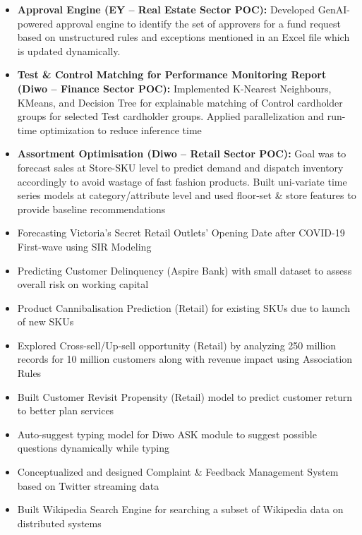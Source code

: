\documentclass[a4paper,10pt]{article}
\begin{document}
\begin{itemize}


\item \textbf{Approval Engine (EY -- Real Estate Sector POC): }{Developed GenAI-powered approval engine to identify the set of approvers for a fund request based on unstructured rules and exceptions mentioned in an Excel file which is updated dynamically.}


\item \textbf{Test \& Control Matching for Performance Monitoring Report (Diwo -- Finance Sector POC): }{Implemented K-Nearest Neighbours, KMeans, and Decision Tree for explainable matching of Control cardholder groups for selected Test cardholder groups. Applied parallelization and run-time optimization to reduce inference time}

\item \textbf{Assortment Optimisation (Diwo -- Retail Sector POC): }{Goal was to forecast sales at Store-SKU level to predict demand and dispatch inventory accordingly to avoid wastage of fast fashion products. Built uni-variate time series models at category/attribute level and used floor-set \& store features to provide baseline recommendations 
}

\item Forecasting Victoria's Secret Retail Outlets' Opening Date after COVID-19 First-wave using SIR Modeling
\item Predicting Customer Delinquency (Aspire Bank) with small dataset to assess overall risk on working capital
\item Product Cannibalisation Prediction (Retail) for existing SKUs due to launch of new SKUs
\item Explored Cross-sell/Up-sell opportunity (Retail) by analyzing 250 million records for 10 million customers along with revenue impact using Association Rules
\item Built Customer Revisit Propensity (Retail) model to predict customer return to better plan services 
\item Auto-suggest typing model for Diwo ASK module to suggest possible questions dynamically while typing 
\item Conceptualized and designed Complaint \& Feedback Management System based on Twitter streaming data
\item Built Wikipedia Search Engine for searching a subset of Wikipedia data on distributed systems 

\end{itemize}
\end{document}

